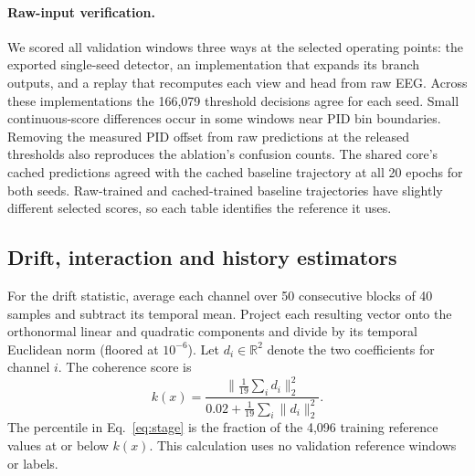 \paragraph{Raw-input verification.}
We scored all validation windows three ways at the selected operating points: the exported single-seed detector, an implementation that expands its branch outputs, and a replay that recomputes each view and head from raw EEG. Across these implementations the 166,079 threshold decisions agree for each seed. Small continuous-score differences occur in some windows near PID bin boundaries. Removing the measured PID offset from raw predictions at the released thresholds also reproduces the ablation's confusion counts. The shared core's cached predictions agreed with the cached baseline trajectory at all 20 epochs for both seeds. Raw-trained and cached-trained baseline trajectories have slightly different selected scores, so each table identifies the reference it uses.

\subsection{Drift, interaction and history estimators}\label{app:implementation}
For the drift statistic, average each channel over 50 consecutive blocks of 40 samples and subtract its temporal mean. Project each resulting vector onto the orthonormal linear and quadratic components and divide by its temporal Euclidean norm (floored at $10^{-6}$). Let $d_i\in\mathbb R^2$ denote the two coefficients for channel $i$. The coherence score is
\begin{equation}
k(x)=\frac{\|\frac{1}{19}\sum_i d_i\|_2^2}{0.02+\frac{1}{19}\sum_i\|d_i\|_2^2}.
\end{equation}
The percentile in Eq.~\eqref{eq:stage} is the fraction of the 4,096 training reference values at or below $k(x)$. This calculation uses no validation reference windows or labels.

